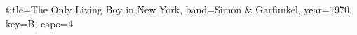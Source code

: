 \documentclass{skrul-leadsheet}
\begin{document}
\begin{song}[transpose-capo=true]{title={The Only Living Boy in New York}, band={Simon \& Garfunkel}, year={1970}, key={B}, capo={4}}




\end{song}
\end{document}
